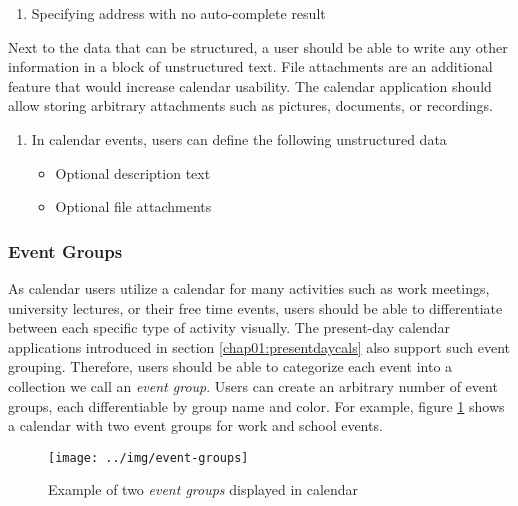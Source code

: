 \begin{enumerate}[label=\color{usecasecolor}\textbf{U{\arabic*}}]
    \item \label{app:uc:event1} Specifying address with no auto-complete result
\end{enumerate}


Next to the data that can be structured, a user should be able to write any other information in a block of unstructured text. File attachments are an additional feature that would increase calendar usability. The calendar application should allow storing arbitrary attachments such as pictures, documents, or recordings.

\begin{enumerate}[label=\color{reqcolor}\textbf{R{\arabic*}}, resume]
    \item \label{app:req:events3} In calendar events, users can define the following unstructured data
        \begin{itemize}
            \item Optional description text
            \item Optional file attachments
        \end{itemize}
\end{enumerate}



\subsubsection*{Event Groups}

As calendar users utilize a calendar for many activities such as work meetings, university lectures, or their free time events, users should be able to differentiate between each specific type of activity visually. The present-day calendar applications introduced in section \ref{chap01:presentdaycals} also support such event grouping. Therefore, users should be able to categorize each event into a collection we call an \textit{event group}. Users can create an arbitrary number of event groups, each differentiable by group name and color. For example, figure \ref{fig:spec:eventgroups} shows a calendar with two event groups for work and school events.

\begin{figure}[!htb]
	\centering
	\texttt{[image: ../img/event-groups]}
	\caption{Example of two \textit{event groups} displayed in calendar}
	\label{fig:spec:eventgroups}
\end{figure}

